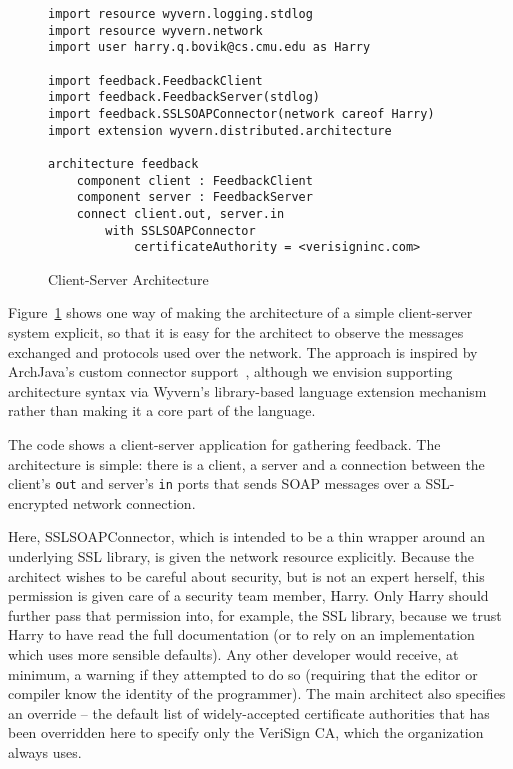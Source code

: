 \documentclass[runningheads]{llncs}
\begin{document}
\begin{sloppypar}
\begin{figure}[t]
\begin{lstlisting}
import resource wyvern.logging.stdlog
import resource wyvern.network
import user harry.q.bovik@cs.cmu.edu as Harry

import feedback.FeedbackClient
import feedback.FeedbackServer(stdlog)
import feedback.SSLSOAPConnector(network careof Harry)
import extension wyvern.distributed.architecture

architecture feedback
    component client : FeedbackClient
    component server : FeedbackServer
    connect client.out, server.in
        with SSLSOAPConnector
            certificateAuthority = <verisigninc.com>
\end{lstlisting}
\caption{Client-Server Architecture}
\label{f-architecture}
\end{figure}

Figure~\ref{f-architecture} shows one way of making the architecture of a simple client-server system explicit, so that it is easy for the architect to observe the messages exchanged and protocols used over the network.  The approach is inspired by ArchJava's custom connector support~\cite{ASCN03}, although we envision supporting architecture syntax via Wyvern's library-based language extension mechanism~\cite{TSLs-ECOOP14} rather than making it a core part of the language.

The code shows a client-server application for gathering feedback.  The architecture is simple: there is a client, a server and a connection between the client's \texttt{out} and server's \texttt{in} ports that sends SOAP messages over a SSL-encrypted network connection. 

Here, SSLSOAPConnector, which is intended to be a thin wrapper around an underlying SSL library, is given the network resource explicitly. Because the architect wishes to be careful about security, but is not an expert herself, this permission is given care of a security team member, Harry. Only Harry should further pass that permission into, for example, the SSL library, because we trust Harry to have read the full documentation (or to rely on an implementation which uses more sensible defaults). Any other developer would receive, at minimum, a warning if they attempted to do so (requiring that the editor or compiler know the identity of the programmer). The main architect also specifies an override -- the default list of widely-accepted certificate authorities that has been overridden here to specify only the VeriSign CA, which the organization always uses.



\end{sloppypar}
\end{document}
